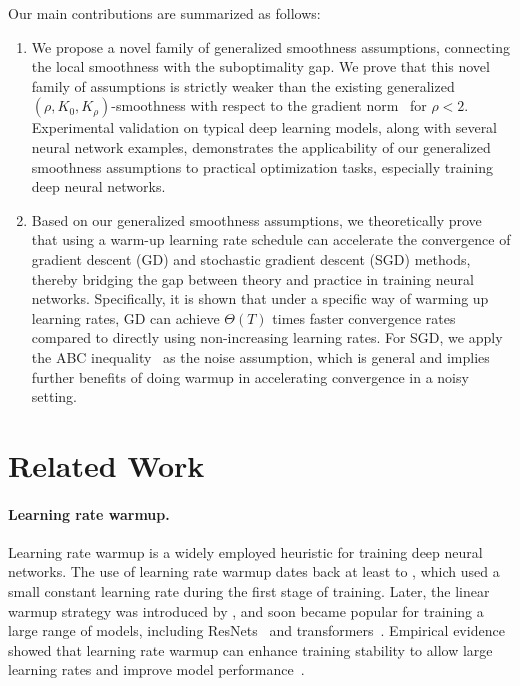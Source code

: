 \documentclass{article}
\begin{document}
Our main contributions are summarized as follows:
\begin{enumerate}
    \item We propose a novel family of generalized smoothness assumptions, connecting the local smoothness with the suboptimality gap. We prove that this novel family of assumptions is strictly weaker than the existing generalized $(\rho,K_0,K_\rho)$-smoothness with respect to the gradient norm~\citep{zhang2020gradient,li2023convex} for $\rho < 2$. 
    {Experimental validation on typical deep learning models, along with several neural network examples, demonstrates the applicability of our generalized smoothness assumptions to practical optimization tasks, especially training deep neural networks.}
    

    \item 
    Based on our generalized smoothness assumptions, we theoretically prove that using a warm-up learning rate schedule can accelerate the convergence of gradient descent (GD) and stochastic gradient descent (SGD) methods, thereby bridging the gap between theory and practice in training neural networks. Specifically, it is shown that under a specific way of warming up learning rates, GD can achieve $\Theta(T)$ times faster convergence rates compared to directly using non-increasing learning rates.
    For SGD, we apply the ABC inequality~\citep{khaled2023better} as the noise assumption, which is general and implies further benefits of doing warmup in accelerating convergence in a noisy setting.

\end{enumerate}

\section{Related Work}
\paragraph{Learning rate warmup.}
Learning rate warmup is a widely employed heuristic for training deep neural networks.
The use of learning rate warmup dates back at least to \cite{he2016deep}, which used a small constant learning rate during the first stage of training. Later, the linear warmup strategy was introduced by \cite{goyal2017accurate}, and soon became popular for training a large range of models, including ResNets~\citep{he2016deep} and transformers~\citep{vaswani2017attention}. 
Empirical evidence showed that learning rate warmup can enhance training stability to allow large learning rates and improve model performance~\citep{gotmare2018a,gilmer2022loss,kalra2024warmup}.
\end{document}
